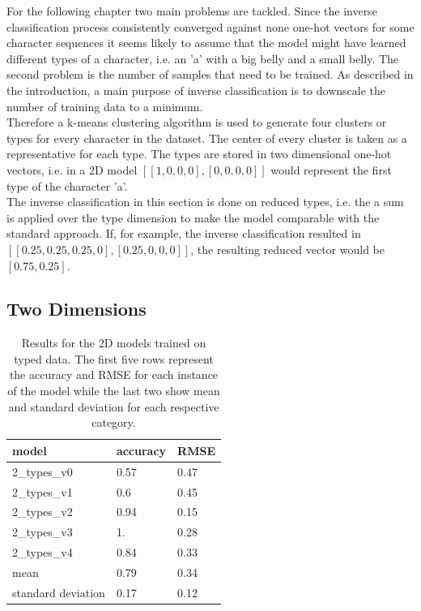 For the following chapter two main problems are tackled. Since the inverse classification process consistently converged against none one-hot vectors for some character sequences it seems likely to assume that the model might have learned different types of a character, i.e. an 'a' with a big belly and a small belly. The second problem is the number of samples that need to be trained. As described in the introduction, a main purpose of inverse classification is to downscale the number of training data to a minimum. \\
Therefore a k-means clustering algorithm is used to generate four clusters or types for every character in the dataset. The center of every cluster is taken as a representative for each type. The types are stored in two dimensional one-hot vectors, i.e. in a 2D model $[[1,0,0,0], [0,0,0,0]]$ would represent the first type of the character 'a'. \\
The inverse classification in this section is done on reduced types, i.e. the a sum is applied over the type dimension to make the model comparable with the standard approach. If, for example, the inverse classification resulted in $[[0.25,0.25,0.25,0],[0.25,0,0,0]]$, the resulting reduced vector would be $[0.75,0.25]$. 

\subsection{Two Dimensions}

\begin{table}[!htb]
	\centering
	\caption{Results for the 2D models trained on typed data. The first five rows represent the accuracy and RMSE for each instance of the model while the last two show mean and standard deviation for each respective category.}
	\begin{tabularx}{\textwidth}{ X  X  X }
		\hline
		model & accuracy & RMSE \\ 
		\hline
		2\_types\_v0 & 0.57 & 0.47 \\ 
		2\_types\_v1 & 0.6 & 0.45 \\
		2\_types\_v2 & 0.94 & 0.15 \\ 
		2\_types\_v3 & 1.  & 0.28 \\ 
		2\_types\_v4 & 0.84 & 0.33 \\ \hline
		mean & 0.79 &  0.34\\
		standard deviation & 0.17 & 0.12\\
		\hline
	\end{tabularx}
	\label{table:2_types}
\end{table}

